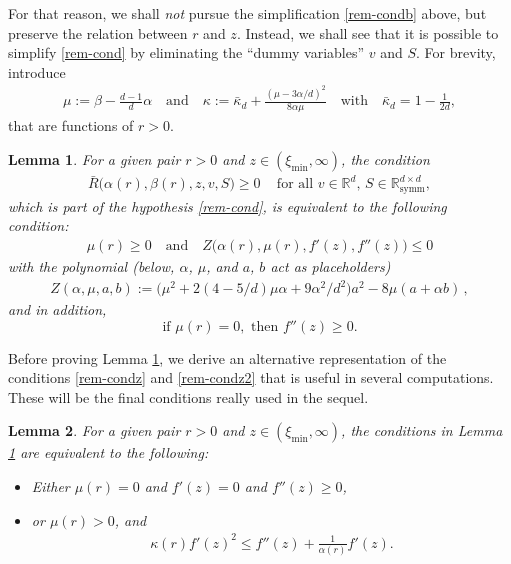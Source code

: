 \documentclass[reqno]{amsart}
\newtheorem{lemma}{Lemma}[section]
\newcommand{\R}{\mathbb{R}}
\begin{document}
For that reason, we shall \emph{not} pursue the simplification \eqref{rem-condb} above, but preserve the relation between $r$ and $z$. Instead, we shall see that it is possible to simplify \eqref{rem-cond} by eliminating the ``dummy variables'' $v$ and $S$. For brevity, introduce
\begin{align}
\label{eq:def-nu}
    \mu:=\beta-\frac{d-1}d\alpha
    \quad\text{and}\quad
    \kappa := \bar\kappa_d + \frac{(\mu-3\alpha/d)^2}{8\alpha\mu}
    \quad\text{with}\quad \bar\kappa_d=1-\frac1{2d},
\end{align}
that are functions of $r>0$.
%
\begin{lemma}\label{lem-char}
    For a given pair $r>0$ and $z\in(\xi_{\min},\infty)$, 
    the condition 
    \begin{align}\label{rem-cond2a}
        \bar R\big(\alpha(r),\beta(r),z,v,S\big)\ge0\,\quad \text{for all $v\in\R^d$, $S\in\R^{d\times d}_{\text{symm}}$},
    \end{align}
    which is part of the hypothesis \eqref{rem-cond}, is equivalent to the following condition:
    \begin{align}
        \label{rem-condz}
        \mu(r)\ge0 \quad \text{and}\quad Z\big(\alpha(r),\mu(r),f'(z),f''(z)\big)\le 0
    \end{align}
    with the polynomial (below, $\alpha$, $\mu$, and $a$, $b$ act as placeholders)
    \begin{align}
        \label{eq:Z}
        Z(\alpha,\mu,a,b) := \big(\mu^2+2(4-5/d)\mu\alpha+9\alpha^2/d^2\big)a^2-8\mu(a+\alpha b)\,,
    \end{align}
    and in addition, 
\begin{equation}\label{rem-condz2}
    \mbox{if }\mu(r)=0,\mbox{ then } f''(z)\ge0.
\end{equation}    
\end{lemma} 
%
Before proving Lemma \ref{lem-char}, we derive an alternative representation of the conditions \eqref{rem-condz} and \eqref{rem-condz2} that is useful in several computations. These will be the final conditions really used in the sequel.
%
\begin{lemma}\label{lem-char2}
    For a given pair $r>0$ and $z\in(\xi_{\min},\infty)$, 
    the conditions in Lemma \ref{lem-char} are equivalent to the following: 
    \begin{itemize}
    \item Either $\mu(r)=0$ and $f'(z)=0$ and $f''(z)\ge0$,
    \item or $\mu(r)>0$, and
        \begin{align}
        \label{rem-cond2old}
            \kappa(r)f'(z)^2
            \le f''(z) + \frac1{\alpha(r)} f'(z).
        \end{align}
    \end{itemize}
\end{lemma}
\end{document}

